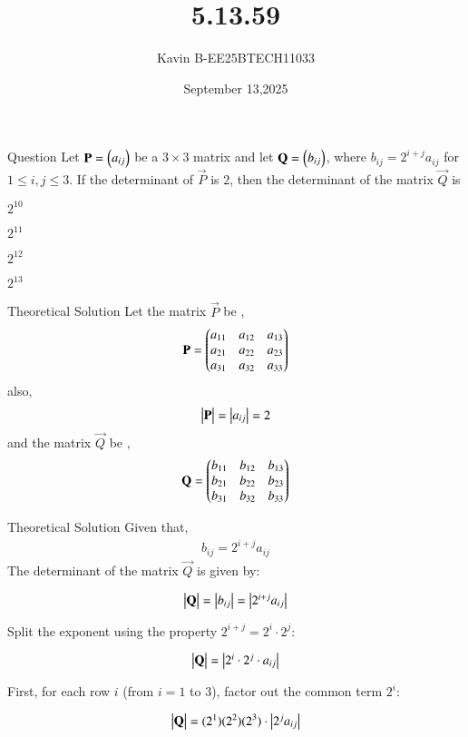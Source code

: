 \documentclass{beamer}
\begin{document}
\title 
{5.13.59}
\date{September 13,2025}


\author 
{Kavin B-EE25BTECH11033}






\frame{\titlepage}
\begin{frame}{Question}
Let $\mathbf{P} = \begin{pmatrix}a_{ij}\end{pmatrix}$ be a $3 \times 3$ matrix and let $\mathbf{Q} =  \begin{pmatrix}b_{ij}\end{pmatrix}$, where $b_{ij} = 2^{i+j}a_{ij}$ for $1 \le i,j \le 3$. If the determinant of $\vec{P}$ is 2, then the determinant of the matrix $\vec{Q}$ is \\
\begin{enumerate}
\begin{multicols}
\item $2^{10}$ \columnbreak
\item $2^{11}$ \columnbreak
\item $2^{12}$\columnbreak
\item $2^{13}$
\end{multicols}
\end{enumerate}
\bigskip
\end{frame}



\begin{frame}{Theoretical Solution}
Let the matrix $\vec{P}$ be ,
\begin{align}
    \mathbf{P} = \begin{pmatrix}a_{11} & a_{12} & a_{13}\\a_{21} & a_{22} & a_{23}\\a_{31} & a_{32} & a_{33}\end{pmatrix}
\end{align}
also,
\begin{align}
    \begin{vmatrix}\mathbf{P}\end{vmatrix} = \begin{vmatrix}a_{ij}\end{vmatrix} = 2
\end{align}
and the matrix $\vec{Q}$ be ,
\begin{align}
    \mathbf{Q} = \begin{pmatrix}b_{11} & b_{12} & b_{13}\\b_{21} & b_{22} & b_{23}\\b_{31} & b_{32} & b_{33}\end{pmatrix}
\end{align}
\end{frame}

\begin{frame}{Theoretical Solution}
Given that,
\begin{align}
    b_{ij} = 2^{i+j}a_{ij}
\end{align}
The determinant of the matrix $\vec{Q}$ is given by:

\begin{align}
\begin{vmatrix}\mathbf{Q}\end{vmatrix} = \begin{vmatrix}b_{ij}\end{vmatrix} = \begin{vmatrix}2^{i+j} a_{ij}\end{vmatrix}
\end{align}

Split the exponent using the property $2^{i+j} = 2^i \cdot 2^j$:

\begin{align}
\begin{vmatrix}\mathbf{Q}\end{vmatrix} = \begin{vmatrix}2^i \cdot 2^j \cdot a_{ij}\end{vmatrix}
\end{align}

First, for each row $i$ (from $i=1$ to $3$),   factor out the common term $2^i$:

\begin{align}
\begin{vmatrix}\mathbf{Q}\end{vmatrix} = (2^1)(2^2)(2^3) \cdot \begin{vmatrix}2^j a_{ij}\end{vmatrix}
\end{align}
\end{frame}
\end{document}
